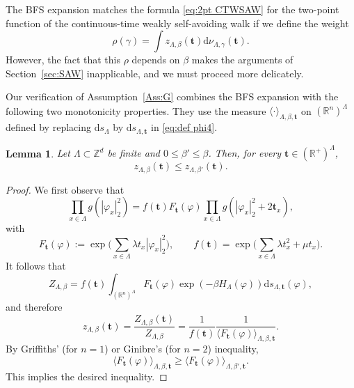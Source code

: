 \documentclass[11pt,a4paper]{article}
\numberwithin{equation}{section}
\theoremstyle{plain}
\newtheorem{Lem}[Thm]{Lemma}
\theoremstyle{definition}
\newcommand\1{\mathds{1}}
\begin{document}
The BFS expansion matches the formula \eqref{eq:2pt CTWSAW} for the two-point function of the continuous-time weakly self-avoiding walk if we define the weight
\begin{equation}
	\rho(\gamma)=\int z_{\Lambda,\beta}(\mathbf{t}) \mathrm{d}\nu_{\Lambda,\gamma}(\mathbf{t}).
\end{equation}
However, the fact that this $\rho$ depends on $\beta$ makes the arguments of Section~\ref{sec:SAW} inapplicable, and we must proceed more delicately.

Our verification of Assumption~\ref{Ass:G} combines the BFS expansion
with the following two  monotonicity properties.
They use the measure $\langle \cdot\rangle_{\Lambda,\beta,\mathbf{t}}$ on $(\mathbb R^n)^\Lambda$ defined by replacing $\mathrm{d}s_{\Lambda}$ by $\mathrm{d}s_{\Lambda,\mathbf{t}}$ in \eqref{eq:def phi4}.


\begin{Lem}\label{lem:phi4 monot BFS}  Let $\Lambda\subset \mathbb Z^d$
be finite and $0\leq \beta'\leq \beta$. Then, for every $\mathbf{t}\in (\mathbb R^+)^\Lambda$,
\begin{equation}
	z_{\Lambda,\beta}(\mathbf{t})\leq z_{\Lambda,\beta'}(\mathbf{t}).
\end{equation}
\end{Lem}

\begin{proof}
We first observe that
\begin{equation}
    \prod_{x\in \Lambda}g(|\varphi_x|^2_2)
    = f(\mathbf{t}) F_{\mathbf{t}}(\varphi)
    \prod_{x\in \Lambda}g(|\varphi_x|^2_2 + 2\mathbf{t}_x),
\end{equation}
with
\begin{equation}\label{eq:defF BFS}
	F_{\mathbf{t}}(\varphi):=\exp\Big(\sum_{x\in \Lambda} \lambda t_x|\varphi_x|^2_2\Big),
    \qquad
    f(\mathbf{t})=\exp\Big(\sum_{x\in \Lambda}\lambda t_x^2+\mu t_x\Big).
\end{equation}
It follows that
\begin{equation}
\label{eq:ZFt}
	Z_{\Lambda,\beta}
    =f(\mathbf{t})
    \int_{(\mathbb R^n)^\Lambda}F_{\mathbf{t}}(\varphi)
    \exp (-\beta H_{\Lambda}(\varphi) ) \mathrm{d}s_{\Lambda,\mathbf{t}}
    (\varphi),
\end{equation}
and therefore
\begin{equation}
    z_{\Lambda,\beta}(\mathbf{t})
    =\frac{Z_{\Lambda,\beta}(\mathbf{t})}{Z_{\Lambda,\beta}}
    =
    \frac{1}{f(\mathbf{t})}
    \frac{1}{\langle F_{\mathbf{t}}(\varphi)\rangle_{\Lambda,\beta,\mathbf{t}}}.
\end{equation}
By Griffiths' (for $n=1$) or Ginibre's (for $n=2$) inequality,
\begin{equation}
	\langle F_{\mathbf{t}}(\varphi)\rangle_{\Lambda,\beta,\mathbf{t}}
    \geq \langle F_{\mathbf{t}}(\varphi)\rangle_{\Lambda,\beta',\mathbf{t}}.
\end{equation}
This implies the desired inequality.
\end{proof}
\end{document}

